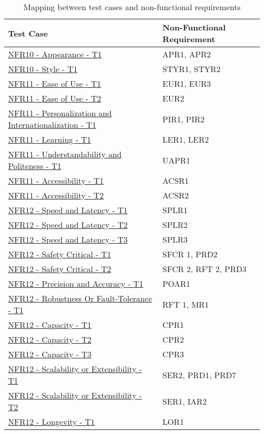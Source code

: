\documentclass[12pt, titlepage]{article}
\begin{document}
\begin{table}
\begin{tabularx}{\textwidth}{p{7cm}p{7cm}}
\toprule {\bf Test Case} & {\bf Non-Functional Requirement}\\
\midrule
\hyperlink{NFR10.1-TC1}{NFR10 - Appearance -  T1} & {APR1, APR2} \\
\hyperlink{NFR10.2-TC1}{NFR10 - Style - T1} & {STYR1, STYR2} \\
\hyperlink{NFR11.1-TC1}{NFR11 - Ease of Use - T1} & {EUR1, EUR3} \\
\hyperlink{NFR11.1-TC2}{NFR11 - Ease of Use - T2} & {EUR2} \\
\hyperlink{NFR11.2-TC1}{NFR11 - Personalization and Internationalization - T1} & {PIR1, PIR2} \\
\hyperlink{NFR11.3-TC1}{NFR11 - Learning - T1} & {LER1, LER2} \\
\hyperlink{NFR11.4-TC1}{NFR11 - Understandability and Politeness - T1} & {UAPR1} \\
\hyperlink{NFR11.5-TC1}{NFR11 - Accessibility - T1} & {ACSR1} \\
\hyperlink{NFR11.5-TC2}{NFR11 - Accessibility - T2} & {ACSR2} \\
\hyperlink{NFR12.1-TC1}{NFR12 - Speed and Latency - T1} & {SPLR1} \\
\hyperlink{NFR12.1-TC2}{NFR12 - Speed and Latency - T2} & {SPLR2} \\
\hyperlink{NFR12.1-TC3}{NFR12 - Speed and Latency - T3} & {SPLR3} \\
\hyperlink{NFR12.2-TC1}{NFR12 - Safety Critical - T1} & {SFCR 1, PRD2} \\
\hyperlink{NFR12.2-TC2}{NFR12 - Safety Critical - T2} & {SFCR 2, RFT 2, PRD3} \\
\hyperlink{NFR12.3-TC1}{NFR12 - Precision and Accuracy - T1} & {POAR1} \\
\hyperlink{NFR12.4-TC1}{NFR12 - Robustness Or Fault-Tolerance - T1} & {RFT 1, MR1} \\
\hyperlink{NFR12.5-TC1}{NFR12 - Capacity - T1} & {CPR1} \\
\hyperlink{NFR12.5-TC2}{NFR12 - Capacity - T2} & {CPR2} \\
\hyperlink{NFR12.5-TC3}{NFR12 - Capacity - T3} & {CPR3} \\
\hyperlink{NFR12.6-TC1}{NFR12 - Scalability or Extensibility - T1} & {SER2, PRD1, PRD7} \\
\hyperlink{NFR12.6-TC2}{NFR12 - Scalability or Extensibility - T2} & {SER1, IAR2} \\
\hyperlink{NFR12.7-TC1}{NFR12 - Longevity - T1} & {LOR1} \\

\bottomrule
\end{tabularx}
\caption{Mapping between test cases and non-functional requirements}
\end{table}
\end{document}
